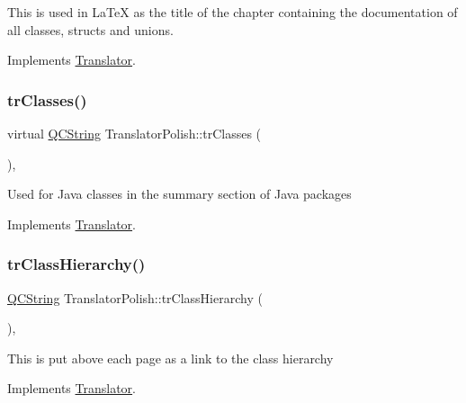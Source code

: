 This is used in La\+TeX as the title of the chapter containing the documentation of all classes, structs and unions. 

Implements \mbox{\hyperlink{class_translator}{Translator}}.

\mbox{\label{class_translator_polish_addab87a21d11341baa38eabe20b70507}} 
\subsubsection{\texorpdfstring{trClasses()}{trClasses()}}
{\footnotesize\ttfamily virtual \mbox{\hyperlink{class_q_c_string}{Q\+C\+String}} Translator\+Polish\+::tr\+Classes (\begin{DoxyParamCaption}{ }\end{DoxyParamCaption})\hspace{0.3cm}{\ttfamily [inline]}, {\ttfamily [virtual]}}

Used for Java classes in the summary section of Java packages 

Implements \mbox{\hyperlink{class_translator}{Translator}}.

\mbox{\label{class_translator_polish_a03be7582d6855399a38f76901e0b8f89}} 
\subsubsection{\texorpdfstring{trClassHierarchy()}{trClassHierarchy()}}
{\footnotesize\ttfamily \mbox{\hyperlink{class_q_c_string}{Q\+C\+String}} Translator\+Polish\+::tr\+Class\+Hierarchy (\begin{DoxyParamCaption}{ }\end{DoxyParamCaption})\hspace{0.3cm}{\ttfamily [inline]}, {\ttfamily [virtual]}}

This is put above each page as a link to the class hierarchy 

Implements \mbox{\hyperlink{class_translator}{Translator}}.

\mbox{\label{class_translator_polish_a853711c5e924af67e3b633ae7094fb86}} 
